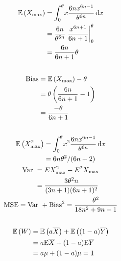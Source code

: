\documentclass[twocolumn]{article}
\numberwithin{equation}{section}
\begin{document}
\subsection{}
\begin{gather*}
\begin{aligned}
\mathbb{E}\left(X_{\max}\right)
&=\int_{0}^{\theta} \! x\frac{6nx^{6n-1}}{\theta^{6n}} \, \mathrm{d} x\\
&=\frac{6n}{\theta^{6n}}\left.\frac{x^{6n+1}}{6n+1}\right|_0^\theta\\
&=\frac{6n}{6n+1}\theta
\end{aligned}
\end{gather*}

\subsection{}
\begin{align*}
\mathrm{Bias}
&=\mathbb{E}\left(X_{\max}\right)-\theta\\
&=\theta\left(\frac{6n}{6n+1}-1\right)\\
&=\frac{-\theta}{6n+1}
\end{align*}

\subsection{}
\begin{gather*}
\begin{aligned}
\mathbb{E}\left(X_{\max}^2\right)
&=\int_{0}^{\theta} \! x^2\frac{6nx^{6n-1}}{\theta^{6n}} \, \mathrm{d} x\\
&=6n\theta^2/(6n+2)\\
\end{aligned}\\
\begin{aligned}
\mathrm{Var}\text{ }&=EX_{\max}^2-E^2X_{\max}\\
&=\frac{3 \theta ^2 n}{(3 n+1) (6 n+1)^2}\\
\end{aligned}\\
\mathrm{MSE}=\mathrm{Var}\text{ }+\mathrm{Bias}^2=\frac{\theta ^2}{18 n^2+9 n+1}
\end{gather*}

\subsection{}\begin{align*}
\mathbb{E}\left(W\right)
&=\mathbb{E}\left(a\overline X\right)+\mathbb{E}\left((1-a)\overline Y\right)\\
&=a\mathrm{E}\overline X+(1-a)\mathrm{E}\overline Y\\
&=a\mu+(1-a)\mu=1
\end{align*}
\end{document}
